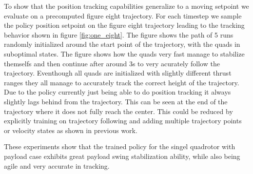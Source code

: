 To show that the position tracking capabilities generalize to a moving setpoint we evaluate on a precomputed figure eight trajectory. For each timestep we sample the policy position setpoint on the figure eight trajectory leading to the tracking behavior shown in figure \ref{fig:one_eight}. The figure shows the path of 5 runs randomly initialized around the start point of the trajectory, with the quads in suboptimal states. The figure shows how the quads very fast manage to stabilize themselfs and then continue after around 3s to very acurately follow the trajectory. Eventhough all quads are initialized with slightly different thrust ranges they all manage to accurately track the correct height of the trajectory.
Due to the policy currently just being able to do position tracking it always slightly lags behind from the trajectory. This can be seen at the end of the trajectory where it does not fully reach the center. This could be reduced by explicitly training on trajectory following and adding multiple trajectory points or velocity states as shown in previous work.

These experiments show that the trained policy for the singel quadrotor with payload case exhibits great payload swing stabilization ability, while also being agile and very accurate in tracking.


